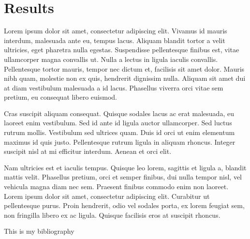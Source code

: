 \documentclass[a4paper, nobind]{templates/ociamthesis}
\newcommand*{\bibtitle}{\textbf{Bibliography}}
\theoremstyle{definition}
\theoremstyle{definition}
\theoremstyle{definition}
\theoremstyle{remark}
\begin{document}
\hypertarget{results}{%
\section{Results}\label{results}}

Lorem ipsum dolor sit amet, consectetur adipiscing elit. Vivamus id mauris interdum, malesuada ante eu, tempus lacus. Aliquam blandit tortor a velit ultricies, eget pharetra nulla egestas. Suspendisse pellentesque finibus est, vitae ullamcorper magna convallis ut. Nulla a lectus in ligula iaculis convallis. Pellentesque tortor mauris, tempor nec dictum et, facilisis sit amet dolor. Mauris nibh quam, molestie non ex quis, hendrerit dignissim nulla. Aliquam sit amet dui at diam vestibulum malesuada a id lacus. Phasellus viverra orci vitae sem pretium, eu consequat libero euismod.

Cras suscipit aliquam consequat. Quisque sodales lacus ac erat malesuada, eu laoreet enim vestibulum. Sed id ante id ligula auctor ullamcorper. Sed luctus rutrum mollis. Vestibulum sed ultrices quam. Duis id orci ut enim elementum maximus id quis justo. Pellentesque rutrum ligula in aliquam rhoncus. Integer suscipit nisl at mi efficitur interdum. Aenean et orci elit.

Nam ultricies est et iaculis tempus. Quisque leo lorem, sagittis et ligula a, blandit mattis velit. Phasellus pretium, orci et semper finibus, dui nulla tempor nisl, vel vehicula magna diam nec sem. Praesent finibus commodo enim non laoreet. Lorem ipsum dolor sit amet, consectetur adipiscing elit. Curabitur ut pellentesque purus. Proin hendrerit, odio vel sodales porta, ex lorem feugiat sem, non fringilla libero ex ac ligula. Quisque facilisis eros at suscipit rhoncus.

This is my bibliography





\nocite{*}

\setlength{\baselineskip}{0pt} %

{\renewcommand*\MakeUppercase[1]{#1}%
\printbibliography[heading=bibintoc,title={\bibtitle}]}
\end{document}
